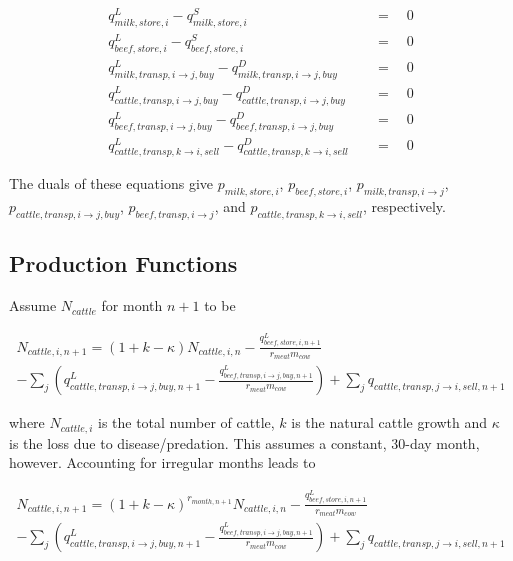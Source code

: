 \documentclass[letter,12pt]{article}
\begin{document}
\begin{align}
q_{milk,store,i}^L - q_{milk,store,i}^S \quad &= \quad  0\\
q_{beef,store,i}^L - q_{beef,store,i}^S \quad &= \quad  0\\
q_{milk,transp,i \rightarrow j,buy}^L - q_{milk,transp,i \rightarrow j,buy}^D \quad &= \quad  0  \\
q_{cattle,transp,i \rightarrow j,buy}^L - q_{cattle,transp,i \rightarrow j,buy}^D \quad &= \quad  0 \\
q_{beef,transp,i \rightarrow j,buy}^L - q_{beef,transp,i \rightarrow j,buy}^D \quad &= \quad  0  \\
q_{cattle,transp,k \rightarrow i,sell}^L - q_{cattle,transp,k \rightarrow i,sell}^D \quad &= \quad  0
\end{align}

The duals of these equations give $p_{milk,store,i}$, $p_{beef,store,i}$, $p_{milk,transp,i \rightarrow j}$, $p_{cattle,transp,i \rightarrow j,buy}$, $p_{beef,transp,i \rightarrow j}$, and $p_{cattle,transp,k \rightarrow i,sell}$, respectively.


\subsection{Production Functions}

Assume $N_{cattle}$ for month $n+1$ to be 

\begin{align}
N_{cattle,i,n+1} = \left(1 + k - \kappa \right) N_{cattle,i,n} - \frac{q_{beef,store,i,n+1}^L}{r_{meat} m_{cow}} \nonumber \\
- \sum_j \left( q_{cattle,transp,i \rightarrow j,buy,n+1}^L - \frac{q_{beef,transp,i \rightarrow j,buy,n+1}^L}{r_{meat} m_{cow}} \right) + \sum_{j} q_{cattle,transp,j\rightarrow i,sell,n+1}
\end{align}

\noindent where $N_{cattle,i}$ is the total number of cattle, $k$ is the natural cattle growth and $\kappa$ is the loss due to disease/predation.  This assumes a constant, 30-day month, however.  Accounting for irregular months leads to

\begin{align}
N_{cattle,i,n+1} = \left(1 + k - \kappa \right)^{r_{month,n+1}} N_{cattle,i,n} - \frac{q_{beef,store,i,n+1}^L}{r_{meat} m_{cow}} \nonumber \\
- \sum_j \left( q_{cattle,transp,i \rightarrow j,buy,n+1}^L - \frac{q_{beef,transp,i \rightarrow j,buy,n+1}^L}{r_{meat} m_{cow}} \right) + \sum_{j} q_{cattle,transp,j\rightarrow i,sell,n+1}
\end{align}
\end{document}
